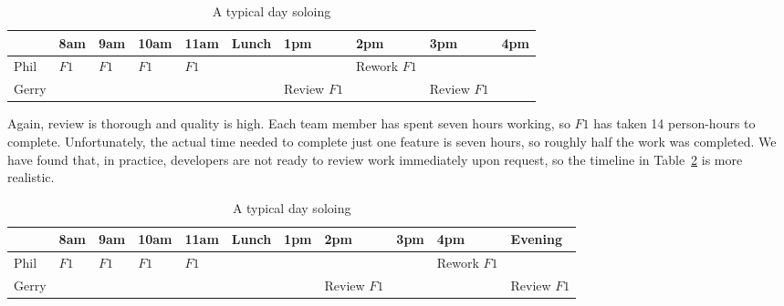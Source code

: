 \documentclass[letterpaper]{article}
\theoremstyle{definition}
\begin{document}
    \begin{table}[h]
        \centering
        \tiny
        \begin{tabular}{ |l|l|l|l|l|l|l|l|l|l| }
            \hline
            & 8am                     & 9am                     & 10am                    & 11am                    & Lunch & 1pm                            & 2pm                            & 3pm                            & 4pm \\
            \hline
            Phil  & \cellcolor{blue!10}$F1$ & \cellcolor{blue!10}$F1$ & \cellcolor{blue!10}$F1$ & \cellcolor{blue!10}$F1$ &       &        & \cellcolor{blue!10}Rework $F1$ &        &     \\
            \hline
            Gerry &                         &                         &                         &                         &       & \cellcolor{blue!10}Review $F1$ &                                & \cellcolor{blue!10}Review $F1$ &     \\
            \hline
        \end{tabular}
        \caption{A typical day soloing}
        \label{tab:serial-solo}
    \end{table}

    Again, review is thorough and quality is high.
    Each team member has spent seven hours working, so $F1$ has taken 14 person-hours to complete.
    Unfortunately, the actual time needed to complete just one feature is seven hours, so roughly half the work was
    completed.
    We have found that, in practice, developers are not ready to review work immediately upon request,
    so the timeline in Table~\ref{tab:serial-solo-realistic} is more realistic.

    \begin{table}[h]
        \centering
        \tiny
        \begin{tabular}{ |l|l|l|l|l|l|l|l|l|l|l| }
            \hline
            & 8am                     & 9am                     & 10am                    & 11am                    & Lunch & 1pm & 2pm                            & 3pm & 4pm                            & Evening                        \\
            \hline
            Phil  & \cellcolor{blue!10}$F1$ & \cellcolor{blue!10}$F1$ & \cellcolor{blue!10}$F1$ & \cellcolor{blue!10}$F1$ &       &     &        &     & \cellcolor{blue!10}Rework $F1$ &         \\
            \hline
            Gerry &                         &                         &                         &                         &       &     & \cellcolor{blue!10}Review $F1$ &     &                                & \cellcolor{blue!10}Review $F1$ \\
            \hline
        \end{tabular}
        \caption{A typical day soloing}
        \label{tab:serial-solo-realistic}
    \end{table}
\end{document}
